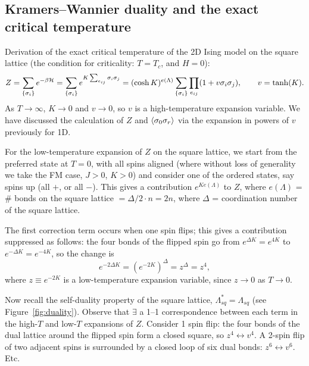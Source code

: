 \subsection{Kramers--Wannier duality and the exact critical temperature}\label{sec:htlt}

Derivation of the exact critical temperature of the 2D Ising model on the square lattice (the
condition for criticality: $T = T_c$, and $H = 0$):
\begin{equation}
  Z = \sum_{\{\sigma_i\}}e^{-\beta\mathcal{H}} = \sum_{\{\sigma_i\}}e^{K\sum_{e_{ij}}\sigma_i\sigma_j}
    = (\cosh K)^{e(\Lambda)}\sum_{\{\sigma_i\}}\prod_{e_{ij}}(1+v\sigma_i\sigma_j),\qquad v = \tanh(K).
\end{equation}
As $T\to\infty$, $K\to 0$ and $v\to 0$, so $v$ is a high-temperature expansion variable. We have
discussed the calculation of $Z$ and $\langle \sigma_0\sigma_r\rangle$ via the expansion in powers of $v$
previously for 1D.

For the low-temperature expansion of $Z$ on the square lattice, we start from the preferred state
at $T = 0$, with all spins aligned (where without loss of generality we take the FM case, $J>0$,
$K>0$) and consider one of the ordered states, say spins up (all $+$, or all $-$). This gives a
contribution $e^{Ke(\Lambda)}$ to $Z$, where $e(\Lambda)$ = \# bonds on the square lattice
$=\Delta/2\cdot n = 2n$, where $\Delta$ = coordination number of the square lattice.

The first correction term occurs when one spin flips; this gives a contribution suppressed as
follows: the four bonds of the flipped spin go from $e^{\Delta K} = e^{4K}$ to
$e^{-\Delta K} = e^{-4K}$, so the change is
\begin{equation}
  e^{-2\Delta K} = (e^{-2K})^\Delta = z^\Delta = z^4,
\end{equation}
where $z\equiv e^{-2K}$ is a low-temperature expansion variable, since $z\to 0$ as $T\to 0$.

Now recall the self-duality property of the square lattice, $\Lambda_{sq}^* = \Lambda_{sq}$ (see
Figure~\ref{fig:duality}). Observe that $\exists$ a 1--1 correspondence between each term in the
high-$T$ and low-$T$ expansions of $Z$. Consider 1 spin flip: the four bonds of the dual lattice
around the flipped spin form a closed square, so $z^4\leftrightarrow v^4$. A 2-spin flip of two
adjacent spins is surrounded by a closed loop of six dual bonds: $z^6\leftrightarrow v^6$. Etc.

